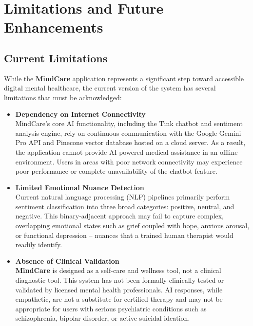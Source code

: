 \documentclass[a4paper,12pt]{report}
\begin{document}
\chapter{Limitations and Future Enhancements}
\section{Current Limitations}
While the \textbf{MindCare} application represents a significant step toward accessible digital mental healthcare, the current version of the system has several limitations that must be acknowledged:
\begin{itemize}
    \item \textbf{Dependency on Internet Connectivity}\\
    MindCare's core AI functionality, including the Tink chatbot and sentiment analysis engine, rely on continuous communication with the Google Gemini Pro API and Pinecone vector database hosted on a cloud server. As a result, the application cannot provide AI-powered medical assistance in an offline environment. Users in areas with poor network connectivity may experience poor performance or complete unavailability of the chatbot feature.
    
    \item \textbf{Limited Emotional Nuance Detection}\\
    Current natural language processing (NLP) pipelines primarily perform sentiment classification into three broad categories: positive, neutral, and negative. This binary-adjacent approach may fail to capture complex, overlapping emotional states such as grief coupled with hope, anxious arousal, or functional depression -- nuances that a trained human therapist would readily identify.
    
    \item \textbf{Absence of Clinical Validation}\\
    \textbf{MindCare} is designed as a self-care and wellness tool, not a clinical diagnostic tool. This system has not been formally clinically tested or validated by licensed mental health professionals. AI responses, while empathetic, are not a substitute for certified therapy and may not be appropriate for users with serious psychiatric conditions such as schizophrenia, bipolar disorder, or active suicidal ideation.
    

\end{itemize}
\end{document}
